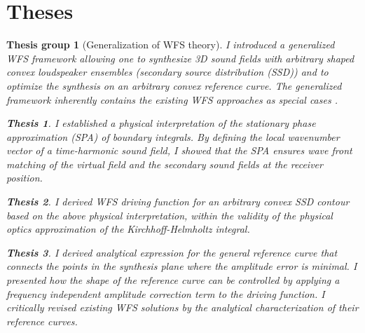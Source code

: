 \documentclass[10pt,twoside]{article}
\theoremstyle{thesisgroupstyle}
\newtheorem{thesisgroup}{Thesis group}
\theoremstyle{indented}
\newtheorem{thesis}{Thesis}[thesisgroup]
\begin{document}
\clearpage	
\section{Theses}
\label{sec:theses}

\begin{thesisgroup}[Generalization of WFS theory]
I introduced a generalized WFS framework allowing one to synthesize 3D sound fields with arbitrary shaped convex loudspeaker ensembles (secondary source distribution (SSD)) and to optimize the synthesis on an arbitrary convex reference curve. 
The generalized framework inherently contains the existing WFS approaches as special cases \cite{Firtha2016_booklet}.
\begin{thesis}
I established a physical interpretation of the stationary phase approximation (SPA) of boundary integrals.
By defining the local wavenumber vector of a time-harmonic sound field, I showed that the SPA ensures wave front matching of the virtual field and the secondary sound fields at the receiver position.
\end{thesis}
\begin{thesis}
I derived WFS driving function for an arbitrary convex SSD contour based on the above physical interpretation, within the validity of the physical optics approximation of the Kirchhoff-Helmholtz integral.
\end{thesis}
\begin{thesis}
I derived analytical expression for the general \emph{reference curve} that connects the points in the synthesis plane where the amplitude error is minimal.
I presented how the shape of the reference curve can be controlled by applying a frequency independent amplitude correction term to the driving function.
I critically revised existing WFS solutions by the analytical characterization of their reference curves. 
\end{thesis}
\end{thesisgroup}
\end{document}
